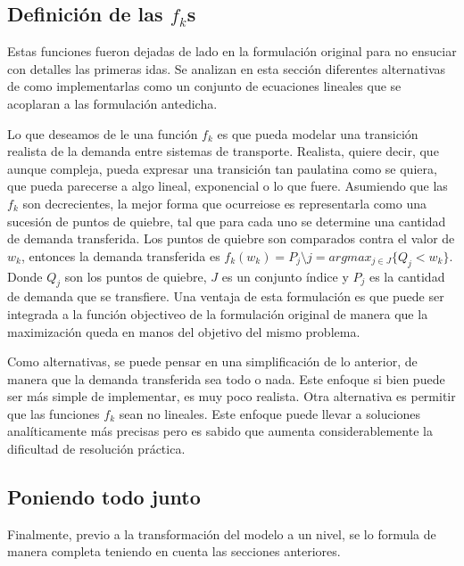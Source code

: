 \documentclass{article}
\begin{document}
  \subsection*{Definición de las $f_k$s}

  Estas funciones fueron dejadas de lado en la formulación original para no ensuciar con detalles las primeras idas. Se analizan en esta sección diferentes alternativas de como implementarlas como un conjunto de ecuaciones lineales que se acoplaran a las formulación antedicha.

  Lo que deseamos de le una función $f_k$ es que pueda modelar una transición realista de la demanda entre sistemas de transporte. Realista, quiere decir, que aunque compleja, pueda expresar una transición tan paulatina como se quiera, que pueda parecerse a algo lineal, exponencial o lo que fuere. Asumiendo que las $f_k$ son decrecientes, la mejor forma que ocurreiose es representarla como una sucesión de puntos de quiebre, tal que para cada uno se determine una cantidad de demanda transferida. Los puntos de quiebre son comparados contra el valor de $w_k$, entonces la demanda transferida es $f_k(w_k) = P_j \setminus j = argmax_{j \in J} \{Q_j < w_k\}$. Donde $Q_j$ son los puntos de quiebre, $J$ es un conjunto índice y $P_j$ es la cantidad de demanda que se transfiere. Una ventaja de esta formulación es que puede ser integrada a la función objectiveo de la formulación original de manera que la maximización queda en manos del objetivo del mismo problema.

  Como alternativas, se puede pensar en una simplificación de lo anterior, de manera que la demanda transferida sea todo o nada. Este enfoque si bien puede ser más simple de implementar, es muy poco realista. Otra alternativa es permitir que las funciones $f_k$ sean no lineales. Este enfoque puede llevar a soluciones analíticamente más precisas pero es sabido que aumenta considerablemente la dificultad de resolución práctica.

  \subsection*{Poniendo todo junto}

  Finalmente, previo a la transformación del modelo a un nivel, se lo formula de manera completa teniendo en cuenta las secciones anteriores.
\end{document}
